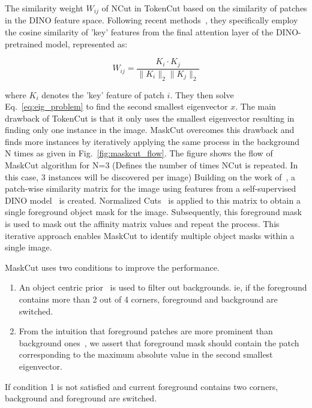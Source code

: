 The similarity weight \( W_{ij} \) of NCut in TokenCut based on the similarity of patches in the DINO feature space. Following recent methods~\cite{simeoni2021localizingobjectsselfsupervisedtransformers, vangansbeke2022discoveringobjectmaskstransformers, wang2023tokencutsegmentingobjectsimages}, they specifically employ the cosine similarity of 'key' features from the final attention layer of the DINO-pretrained model, represented as:

\begin{equation}
W_{ij} = \frac{K_i \cdot K_j}{\|K_i\|_2 \|K_j\|_2}
\end{equation}

where \( K_i \) denotes the 'key' feature of patch \( i \). They then solve Eq.~\ref{eq:eig_problem} to find the second smallest eigenvector \( x \). The main drawback of TokenCut is that it only uses the smallest eigenvector resulting in finding only one instance in the image. MaskCut overcomes this drawback and finds more instances by iteratively applying the same process in the background N times as given in Fig.~\ref{fig:maskcut_flow}. The figure shows the flow of MaskCut algorithm for N=3 (Defines the number of times NCut is repeated. In this case, 3 instances will be discovered per image) Building on the work of~\cite{wang2023tokencutsegmentingobjectsimages, caron2021emergingpropertiesselfsupervisedvision}, a patch-wise similarity matrix for the image using features from a self-supervised DINO model~\cite{caron2021emerging} is created. Normalized Cuts~\cite{normcut} is applied to this matrix to obtain a single foreground object mask for the image. Subsequently, this foreground mask is used to mask out the affinity matrix values and repeat the process. This iterative approach enables MaskCut to identify multiple object masks within a single image.

MaskCut uses two conditions to improve the performance.
\begin{enumerate}
	\item An object centric prior~\cite{obj_centric_prior} is used to filter out backgrounds. ie, if the foreground contains more than 2 out of 4 corners, foreground and background are switched.
	
	\item From the intuition that foreground patches are more prominent than background ones~\cite{caron2021emergingpropertiesselfsupervisedvision, cond1_support_2}, we assert that foreground mask should contain the patch corresponding to the maximum absolute value in the second smallest eigenvector.
\end{enumerate}
  If condition 1 is not satisfied and current foreground contains two corners, background and foreground are switched.

